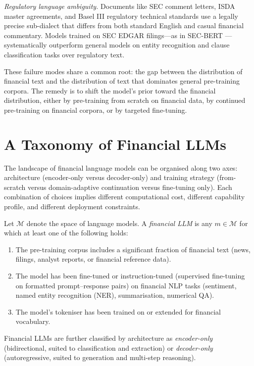 \textit{Regulatory language ambiguity.}  Documents like SEC comment letters, ISDA
master agreements, and Basel III regulatory technical standards use a legally
precise sub-dialect that differs from both standard English and casual financial
commentary.  Models trained on SEC EDGAR filings---as in SEC-BERT
\cite{loukas2022secbert}---systematically outperform general models on entity
recognition and clause classification tasks over regulatory text.

These failure modes share a common root: the gap between the distribution of
financial text and the distribution of text that dominates general pre-training
corpora.  The remedy is to shift the model's prior toward the financial distribution,
either by pre-training from scratch on financial data, by continued pre-training on
financial corpora, or by targeted fine-tuning.

\section{A Taxonomy of Financial LLMs}
\label{sec:ch08-taxonomy}

The landscape of financial language models can be organised along two axes:
architecture (encoder-only versus decoder-only) and training strategy
(from-scratch versus domain-adaptive continuation versus fine-tuning only).
Each combination of choices implies different computational cost, different
capability profile, and different deployment constraints.

\begin{definition}
\label{def:ch08-taxonomy}
Let $\mathcal{M}$ denote the space of language models.  A \emph{financial LLM}
is any $m \in \mathcal{M}$ for which at least one of the following holds:
\begin{enumerate}
  \item The pre-training corpus includes a significant fraction of financial text
        (news, filings, analyst reports, or financial reference data).
  \item The model has been fine-tuned or instruction-tuned (supervised fine-tuning on formatted prompt--response pairs) on financial NLP tasks
        (sentiment, named entity recognition (NER), summarisation, numerical QA).
  \item The model's tokeniser has been trained on or extended for financial vocabulary.
\end{enumerate}
Financial LLMs are further classified by architecture as \emph{encoder-only}
(bidirectional, suited to classification and extraction) or \emph{decoder-only}
(autoregressive, suited to generation and multi-step reasoning).
\end{definition}

